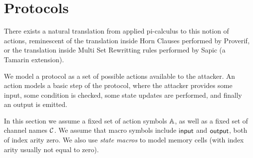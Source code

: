 \section{Protocols}


There exists a natural translation from applied pi-calculus to this notion of
actions, reminescent of the translation inside Horn Clauses performed by
Proverif, or the translation inside Multi Set Rewritting rules performed by
Sapic (a Tamarin extension).

\bigskip

We  model a protocol as a set of possible actions available to the
attacker. An action models a basic step of the protocol, where
the attacker provides some input, some condition is checked, some
state updates are performed, and finally an output is emitted.

In this section we assume a fixed set of action symbols $\mathbb{A}$,
as well as a fixed set of channel names $\mathcal{C}$.
We assume that macro symbols include $\textsf{input}$ and $\textsf{output}$,
both of index arity zero.
We also use \emph{state macros} to model memory cells
(with index arity usually not equal to zero).

